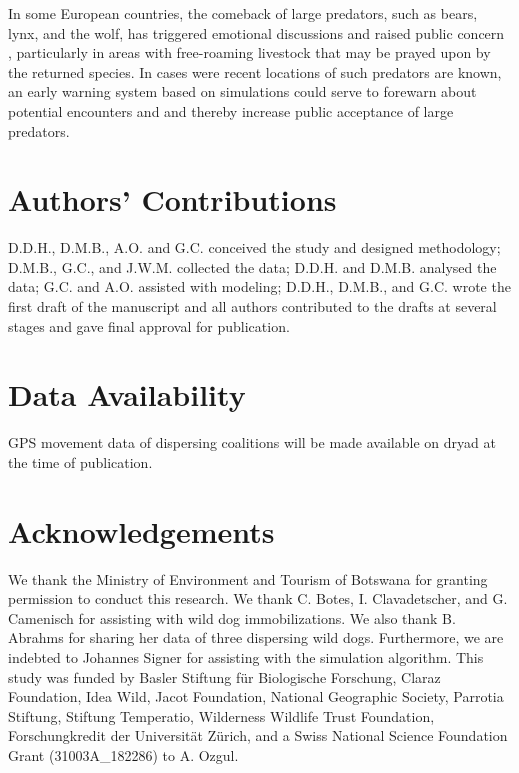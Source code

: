 \documentclass[abstract=on,10pt,a4paper,bibliography=totocnumbered]{article}
\begin{document}
In some European countries, the comeback of large predators, such as bears,
lynx, and the wolf, has triggered emotional discussions and raised public
concern \citep{Behr.2017}, particularly in areas with free-roaming livestock
that may be prayed upon by the returned species. In cases were recent locations
of such predators are known, an early warning system based on simulations could
serve to forewarn about potential encounters and and thereby increase public
acceptance of large predators.

\section{Authors' Contributions}
D.D.H., D.M.B., A.O. and G.C. conceived the study and designed methodology;
D.M.B., G.C., and J.W.M. collected the data; D.D.H. and D.M.B. analysed the
data; G.C. and A.O. assisted with modeling; D.D.H., D.M.B., and G.C. wrote the
first draft of the manuscript and all authors contributed to the drafts at
several stages and gave final approval for publication.

\section{Data Availability}
GPS movement data of dispersing coalitions will be made available on dryad at
the time of publication.

\section{Acknowledgements}
We thank the Ministry of Environment and Tourism of Botswana for granting
permission to conduct this research. We thank C. Botes, I. Clavadetscher, and G.
Camenisch for assisting with wild dog immobilizations. We also thank B. Abrahms
for sharing her data of three dispersing wild dogs. Furthermore, we are indebted
to Johannes Signer for assisting with the simulation algorithm. This study was
funded by Basler Stiftung für Biologische Forschung, Claraz Foundation, Idea
Wild, Jacot Foundation, National Geographic Society, Parrotia Stiftung, Stiftung
Temperatio, Wilderness Wildlife Trust Foundation, Forschungkredit der
Universität Zürich, and a Swiss National Science Foundation Grant
(31003A\_182286) to A. Ozgul.

\newpage
\begingroup
\singlespacing

\endgroup
\end{document}
